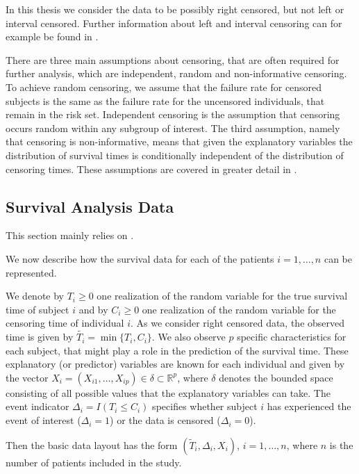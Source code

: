 \documentclass[12pt, a4paper]{article}
\theoremstyle{definition}
\theoremstyle{plain}
\numberwithin{equation}{section}
\numberwithin{figure}{section}
\numberwithin{table}{section}
\begin{document}
	In this thesis we consider the data to be possibly right censored, but not left or interval censored.
	Further information about left and interval censoring can for example be found in \citet*{bookfailuretime}.
	
	There are three main assumptions about censoring, that are often required for further analysis, which are independent, random and non-informative censoring.
	To achieve random censoring, we assume that the failure rate for censored subjects is the same as the failure rate for the uncensored individuals, that remain in the risk set.
	Independent censoring is the assumption that censoring occurs random within any subgroup of interest.
	The third assumption, namely that censoring is non-informative, means that given the explanatory variables the distribution of survival times is conditionally independent of the distribution of censoring times.
	These assumptions are covered in greater detail in \citet*{bookfailuretime}.
	
	
	\subsection{Survival Analysis Data} \label{sabasics}
	
	This section mainly relies on \citet*{sabook}.
	
	We now describe how the survival data for each of the patients $i = 1, \dots, n$ can be represented.
	
	We denote by $T_i \geq 0$ one realization of the random variable for the true survival time of subject $i$ and by $C_i \geq 0$ one realization of the random variable for the censoring time of individual $i$.
	As we consider right censored data, the observed time is given by $\tilde{T_i} = \min\{T_i,C_i\}$.
	We also observe $p$ specific characteristics for each subject, that might play a role in the prediction of the survival time.
	These explanatory (or predictor) variables are known for each individual and given by the vector $X_i = (X_{i1}, \dots , X_{ip}) \in \delta \subset \mathbb{R}^p$, where $\delta$ denotes the bounded space consisting of all possible values that the explanatory variables can take.
	The event indicator $\Delta_i = I(T_i \leq C_i)$ specifies whether subject $i$ has experienced the event of interest ($\Delta_i=1$) or the data is censored ($\Delta_i=0$).
	
	Then the basic data layout has the form $(\tilde{T}_i, \Delta_i, X_i)$, $i = 1, \dots , n$, where $n$ is the number of patients included in the study.
	
\end{document}
